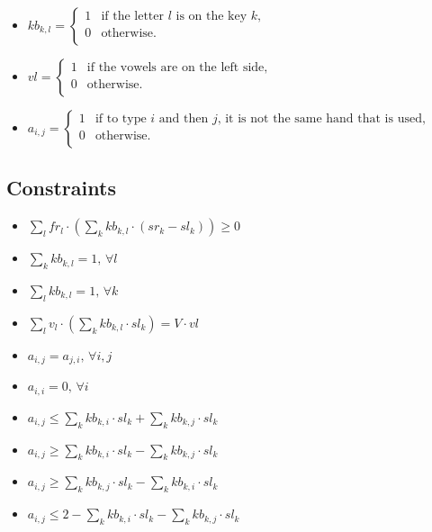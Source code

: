 \documentclass[a4paper,titlepage]{article}
\begin{document}
\begin{itemize}
 	\item$kb_{k,l} = \left\{ 
	\begin{array}{ll}
		1 & \text{if the letter $l$ is on the key $k$,}\\
		0 & \text{otherwise.}\\
	\end{array}
	\right.$

	\item $vl = \left\{ 
	\begin{array}{ll}
		1 & \text{if the vowels are on the left side,}\\
		0 & \text{otherwise.}\\
	\end{array}
	\right.$

	\item $a_{i,j} = \left\{ 
	\begin{array}{ll}
		1 & \text{if to type $i$ and then $j$, it is not the same hand that is used,}\\
		0 & \text{otherwise.}\\
	\end{array}
	\right.$	
\end{itemize}

	\subsection{Constraints}

\begin{itemize}
	\item $\sum_l fr_l \cdot \left(\sum_k kb_{k,l} \cdot (sr_k - sl_k) \right) \geq 0$

	\item $\sum_k kb_{k,l} = 1 \text{, } \forall l$

	\item $\sum_l kb_{k,l} = 1 \text{, } \forall k$

	\item $\sum_l v_l \cdot \left( \sum_k kb_{k,l} \cdot sl_k \right) = V \cdot vl$

	\item $a_{i,j} = a_{j,i} \text{, } \forall i,j$

	\item $a_{i,i} = 0 \text{, } \forall i$

	\item $a_{i,j} \leq \sum_k kb_{k,i} \cdot sl_k + \sum_k kb_{k,j} \cdot sl_k$

	\item $a_{i,j} \geq \sum_k kb_{k,i} \cdot sl_k - \sum_k kb_{k,j} \cdot sl_k$

	\item $a_{i,j} \geq \sum_k kb_{k,j} \cdot sl_k - \sum_k kb_{k,i} \cdot sl_k$

	\item $a_{i,j} \leq 2 - \sum_k kb_{k,i} \cdot sl_k - \sum_k kb_{k,j} \cdot sl_k$
\end{itemize}
\end{document}
